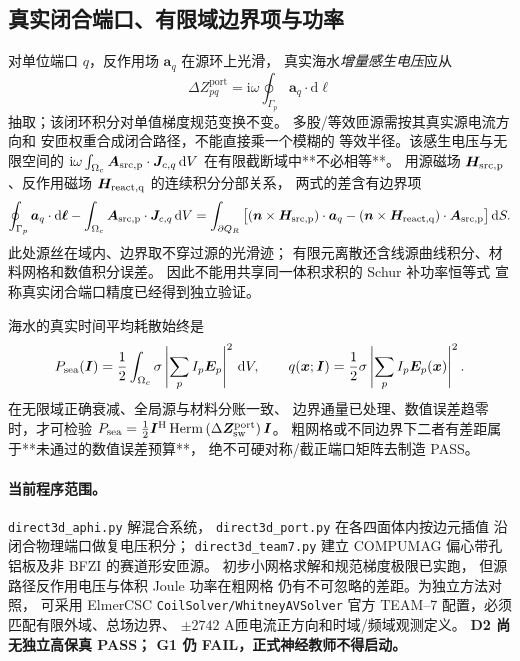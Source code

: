 \subsection{真实闭合端口、有限域边界项与功率}
对单位端口 $q$，反作用场 $\bm a_q$ 在源环上光滑，
真实海水\emph{增量感生电压}应从
\begin{equation}\label{eq:bfzi-d2-real-port-reaction}
 \boxed{\Delta Z_{pq}^{\mathrm{port}}
 =\mathrm i\omega\oint_{\Gamma_p}\bm a_q\cdot
 \mathrm d\bm\ell }
\end{equation}
抽取；该闭环积分对单值梯度规范变换不变。
多股/等效匝源需按其真实源电流方向和
安匝权重合成闭合路径，不能直接乘一个模糊的
等效半径。该感生电压与无限空间的
$\mathrm i\omega\int_{\Omega_c}
  \bm A_{\rm src,p}\cdot\bm J_{c,q}\,\mathrm dV$
在有限截断域中**不必相等**。
用源磁场 $\bm H_{\rm src,p}$、反作用磁场
$\bm H_{\rm react,q}$ 的连续积分分部关系，
两式的差含有边界项
\begin{equation}
 \begin{split}
  \oint_{\Gamma_p}\bm a_q\cdot\mathrm d\bm\ell
   - \int_{\Omega_c}\bm A_{\rm src,p}\cdot
      \bm J_{c,q}\,\mathrm dV
  =\int_{\partial Q_R}\big[
     (\bm n\times\bm H_{\rm src,p})\cdot\bm a_q
    -(\bm n\times\bm H_{\rm react,q})\cdot
       \bm A_{\rm src,p}
    \big]\,\mathrm dS .
 \end{split}
\end{equation}
此处源丝在域内、边界取不穿过源的光滑迹；
有限元离散还含线源曲线积分、材料网格和数值积分误差。
因此不能用共享同一体积求积的 Schur 补功率恒等式
宣称真实闭合端口精度已经得到独立验证。

海水的真实时间平均耗散始终是
\begin{equation}
 P_{\rm sea}(\bm I)=\frac12\int_{\Omega_c}\sigma
    \left|\sum_p I_p\bm E_p\right|^2\,\mathrm dV,
 \qquad q(\bm x;\bm I)=\frac12\sigma
    \left|\sum_p I_p\bm E_p(\bm x)\right|^2.
\end{equation}
在无限域正确衰减、全局源与材料分账一致、
边界通量已处理、数值误差趋零时，才可检验
$P_{\rm sea}=\frac12\bm I^{\mathrm H}
\operatorname{Herm}\left(\Delta\bm Z_{\rm sw}^{\mathrm{port}}\right)\bm I$。
粗网格或不同边界下二者有差距属于**未通过的数值误差预算**，
绝不可硬对称/截正端口矩阵去制造 PASS。

\paragraph{当前程序范围。}
\texttt{direct3d\_aphi.py} 解混合系统，
\texttt{direct3d\_port.py} 在各四面体内按边元插值
沿闭合物理端口做复电压积分；
\texttt{direct3d\_team7.py} 建立 COMPUMAG 偏心带孔
铝板及非 BFZI 的赛道形安匝源。
初步小网格求解和规范梯度极限已实跑，
但源路径反作用电压与体积 Joule 功率在粗网格
仍有不可忽略的差距。为独立方法对照，
可采用 ElmerCSC \texttt{CoilSolver/WhitneyAVSolver}
官方 TEAM--7 配置，必须匹配有限外域、总场边界、
$\pm2742$ A匝电流正方向和时域/频域观测定义。
\textbf{D2 尚无独立高保真 PASS；
G1 仍 FAIL，正式神经教师不得启动。}


